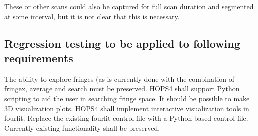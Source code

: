 \TBC{}

These or other scans could also be captured for full scan duration and
segmented at some interval, but it is not clear that this is necessary.

\subsection{Regression testing to be applied to following requirements}
\label{sec:regressreqs}

\begin{description}
 The ability to explore fringes (as is currently done with the
  combination of \acs{fringex}, \acs{average} and search must be preserved.
  HOPS4 shall support \acs{Python} scripting to aid the user in searching
  fringe space.
 It should be possible to make 3D visualization plots.
 HOPS4 shall implement interactive visualization tools in \acs{fourfit}.
 Replace the existing \acs{fourfit} control file with a
  \acs{Python}-based control file. Currently existing functionality shall be
  preserved.


\end{description}
